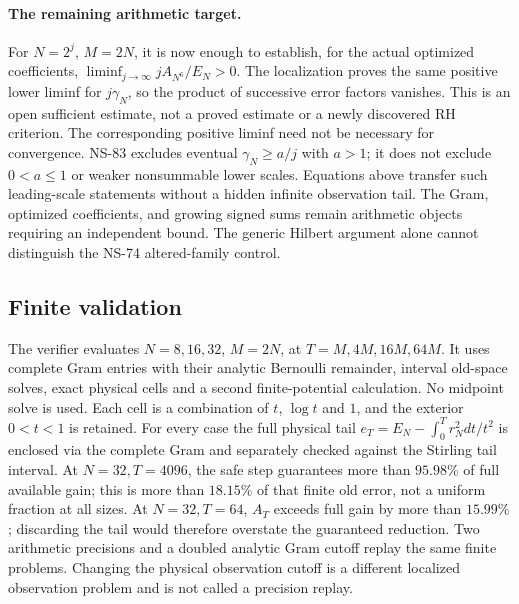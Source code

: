 \paragraph{The remaining arithmetic target.}
For $N=2^j$, $M=2N$, it is now enough to establish, for the actual optimized
coefficients, $\liminf_{j\to\infty}jA_{N^6}/E_N>0$.
The localization proves the same positive lower liminf for $j\gamma_N$,
so the product of successive error factors vanishes. This is an open sufficient
estimate, not a proved estimate or a newly discovered RH criterion.
The corresponding positive liminf need not be necessary for convergence.
NS-83 excludes eventual $\gamma_N\ge a/j$ with $a>1$; it does not
exclude $0<a\le1$ or weaker nonsummable lower scales. Equations above transfer
such leading-scale statements without a hidden infinite observation tail.
The Gram, optimized coefficients, and growing signed sums remain arithmetic
objects requiring an independent bound. The generic Hilbert argument alone
cannot distinguish the NS-74 altered-family control.

\subsection{Finite validation}
The verifier evaluates $N=8,16,32$, $M=2N$, at $T=M,4M,16M,64M$.
It uses complete Gram entries with their analytic Bernoulli remainder,
interval old-space solves, exact physical cells and a second finite-potential
calculation. No midpoint solve is used. Each cell is a combination of
$t$, $\log t$ and $1$, and the exterior $0<t<1$ is retained.
For every case the full physical tail $e_T=E_N-\int_0^Tr_N^2dt/t^2$
is enclosed via the complete Gram and separately checked against the
Stirling tail interval. At $N=32,T=4096$, the safe step guarantees more
than $95.98\%$ of full available gain; this is more than $18.15\%$ of
that finite old error, not a uniform fraction at all sizes.
At $N=32,T=64$, $A_T$ exceeds full gain by more than $15.99\%$;
discarding the tail would therefore overstate the guaranteed reduction.
Two arithmetic precisions and a doubled analytic Gram cutoff replay the same
finite problems. Changing the physical observation cutoff is a different
localized observation problem and is not called a precision replay.
